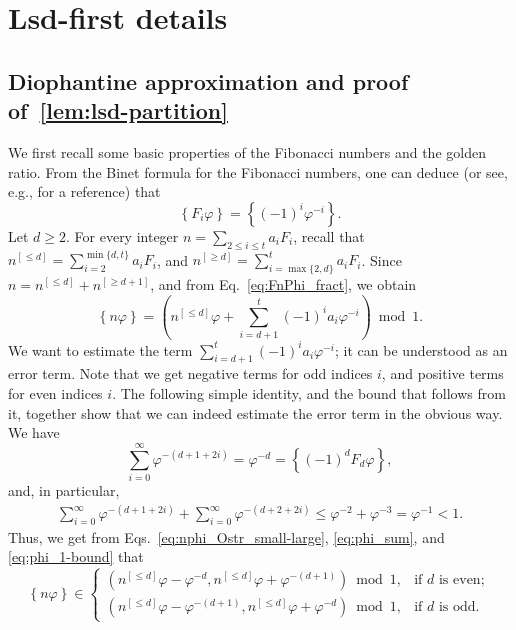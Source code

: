 \documentclass[12pt,runningheads]{llncs}
\renewcommand{\phi}{\varphi}
\newcommand{\fract}[1]{\left\{ #1 \right\}}
\begin{document}
\newpage
\appendix

\section{Lsd-first details} \label{appendix:lsd}

\subsection{Diophantine approximation and proof of~\cref{lem:lsd-partition}}

We first recall some basic properties of the Fibonacci numbers and the golden ratio. From the Binet formula for the Fibonacci numbers, one can deduce (or see, e.g., \cite{Knott:2021} for a reference)
that
\begin{equation}\label{eq:FnPhi_fract}
    \fract{F_i \phi}
    = \fract{(-1)^i \phi^{-i}}.
\end{equation}
Let $d\geq 2$. For every integer $n = \sum_{2\leq i \leq t} a_i F_i$, recall that $n^{[\leq d]} = \sum_{i=2}^{\min\{d,t\}} a_i F_i$, and $n^{[\geq d]} = \sum_{i=\max\{2,d\}}^{t} a_i F_i$. Since $n = n^{[\leq d]} + n^{[\geq d+1]}$, and from Eq.~\eqref{eq:FnPhi_fract}, we obtain 
\begin{equation}\label{eq:nphi_Ostr_small-large}
    \fract{n\phi}
    = \left(n^{[\leq d]} \phi
        + \sum_{i=d+1}^{t} (-1)^i a_i  \phi^{-i} \right) \bmod 1.
\end{equation}
We want to estimate the term $\sum_{i=d+1}^{t} (-1)^i a_i \phi^{-i}$; it can be understood as an error term.
Note that we get negative terms for odd indices $i$, and positive terms for even indices $i$.
The following simple identity, and the bound that follows from it, together show that we can indeed estimate the error term in the obvious way.
We have
\begin{equation}\label{eq:phi_sum}
    \sum_{i = 0}^\infty \phi^{-(d+1+2i)}
    = \phi^{-d}
    = \fract{(-1)^d F_d\phi},
\end{equation}
and, in particular,
\begin{align}\label{eq:phi_1-bound}
    \sum_{i = 0}^\infty \phi^{-(d+1+2i)}
    + \sum_{i = 0}^\infty \phi^{-(d+2+2i)}
    \leq \phi^{-2} + \phi^{-3} = \phi^{-1} < 1.
\end{align}
Thus, we get from Eqs.~\eqref{eq:nphi_Ostr_small-large}, \eqref{eq:phi_sum}, and \eqref{eq:phi_1-bound} that \begin{equation}\label{eq:large_intervals}
    \fract{n\phi} 
    \in \begin{cases}
        \left( {n^{[\leq d]}\phi} - \phi^{-d}, {n^{[\leq d]}\phi} + \phi^{-(d+1)} \right) \bmod 1,
        &\text{if $d$ is even};\\
        \left( {n^{[\leq d]}\phi} - \phi^{-(d+1)}, {n^{[\leq d]}\phi} + \phi^{-d} \right) \bmod 1,
        &\text{if $d$ is odd}.
    \end{cases}
\end{equation}
\end{document}
